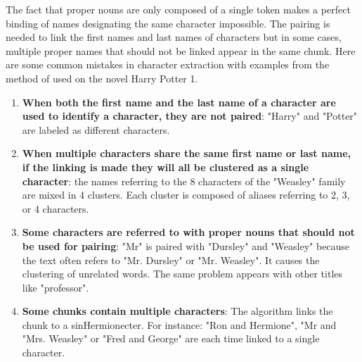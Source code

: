 \documentclass[a4paper, 12pt]{report}
\begin{document}
The fact that proper nouns are only composed of a single token makes a perfect binding of names designating the same character impossible.
The pairing is needed to link the first names and last names of characters but in some cases, multiple proper names that should not be linked appear in the same chunk.
Here are some common mistakes in character extraction with examples from the method of \cite{original} used on the novel Harry Potter 1.
\begin{enumerate}
\item \textbf{When both the first name and the last name of a character are used to identify a character, they are not paired}: "Harry" and "Potter" are labeled as different characters.

\item \textbf{When multiple characters share the same first name or last name, if the linking is made they will all be clustered as a single character}: the names referring to the 8 characters of the "Weasley" family are mixed in 4 clusters. Each cluster is composed of aliases referring to 2, 3, or 4 characters.

\item \textbf{Some characters are referred to with proper nouns that should not be used for pairing}: "Mr" is paired with "Dursley" and "Weasley" because the text often refers to "Mr. Dursley" or "Mr. Weasley". It causes the clustering of unrelated words. The same problem appears with other titles like "professor".

\item \textbf{Some chunks contain multiple characters}: The algorithm links the chunk to a sinHermionecter.
For instance: "Ron and Hermione", "Mr and "Mrs. Weasley" or "Fred and George" are each time linked to a single character.
\end{enumerate}
\end{document}
